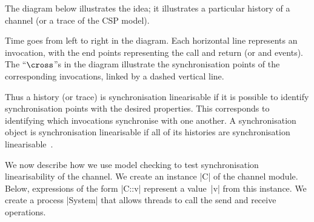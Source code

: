 The diagram below illustrates the idea; it illustrates a particular history
of a channel (or a trace of the CSP model).
%
\begin{center}
\unScalaMid
{}
\scalaMid
\end{center}
%
Time goes from left to right in the diagram.  Each horizontal line represents
an invocation, with the end points representing the call and return (or
 and  events).  The ``$\cross$''s in the diagram
illustrate the synchronisation points of the corresponding invocations, linked
by a dashed vertical line.

Thus a history (or trace) is synchronisation linearisable if it is possible to
identify synchronisation points with the desired properties.  This corresponds
to identifying which invocations synchronise with one another.  A
synchronisation object is synchronisation linearisable if all of its histories
are synchronisation linearisable~\cite{LL:synchronisation}.


\inlineCSP

We now describe how we use model checking to test synchronisation
linearisability of the channel.  We create an instance |C| of the channel
module.  Below, expressions of the form |C::v| represent a value~|v| from this
instance.  We create a process |System| that allows threads to call the send
and receive operations.

